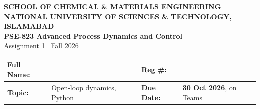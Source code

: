 \documentclass[10pt,a4paper]{article}
\newif\ifkey
\begin{document}

\begin{center}
  {\bfseries SCHOOL OF CHEMICAL \& MATERIALS ENGINEERING}\\[1pt]
  {\bfseries NATIONAL UNIVERSITY OF SCIENCES \& TECHNOLOGY, ISLAMABAD}\\[4pt]
  {\Large\bfseries PSE-823 Advanced Process Dynamics and Control}\\[2pt]
  {\large Assignment 1 \textbullet\ Fall 2026\ifkey\ \textbullet\ \textbf{Answer Key}\fi}
\end{center}
\vspace{1pt}

{\renewcommand{\arraystretch}{1.45}
\begin{tabularx}{\linewidth}{|l X|l p{44mm}|}
  \hline
  \textbf{Full Name:} & & \textbf{Reg \#:} & \\ \hline
  \textbf{Topic:} & Open-loop dynamics, Python & \textbf{Due Date:} & \textbf{30 Oct 2026}, on Teams \\ \hline
\end{tabularx}}
\end{document}
